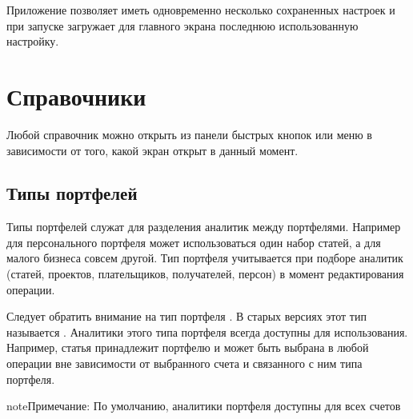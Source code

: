 \documentclass[a4paper,10pt,russian]{sphinxmanual}
\begin{document}
Приложение позволяет иметь одновременно несколько сохраненных настроек и
при запуске загружает для главного экрана последнюю использованную настройку.


\chapter{Справочники}
\label{\detokenize{directories:chapter-directories}}\label{\detokenize{directories:id1}}\label{\detokenize{directories::doc}}
Любой справочник можно открыть из панели быстрых кнопок или меню  в зависимости от того,
какой экран открыт в данный момент.

\noindent{}

\noindent{}


\section{Типы портфелей}
\label{\detokenize{directories:id2}}
Типы портфелей служат для разделения аналитик между портфелями. Например для персонального портфеля
может использоваться один набор статей, а для малого бизнеса совсем другой.
Тип портфеля учитывается при подборе аналитик (статей, проектов, плательщиков, получателей, персон) в
момент редактирования операции.

\noindent{}

\noindent{}

\noindent{}

Следует обратить внимание на тип портфеля . В старых версиях этот тип называется .
Аналитики этого типа портфеля всегда доступны для использования. Например, статья 
принадлежит портфелю  и может быть выбрана в любой операции вне зависимости от выбранного счета и
связанного с ним типа портфеля.

\begin{sphinxadmonition}{note}{Примечание:}
По умолчанию, аналитики портфеля  доступны для всех счетов
\end{sphinxadmonition}
\end{document}
